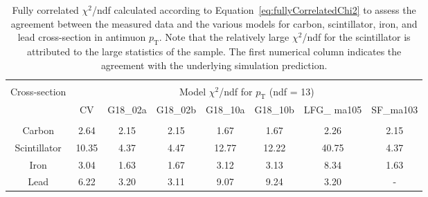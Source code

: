 \begin{table}[t!]
    \centering
    \begin{adjustbox}{width=1.01\textwidth,center=\textwidth}
    \begin{tabular}{c c c c c c c c}
    \hline \\ [-1.5 ex]
    \multirow[c]{2}{*}{Cross-section} & \multicolumn{7}{c}{Model $\chi^2$/ndf for $p_{\text{T}}$ (ndf = 13) } \\ [0.8ex]
    & CV & G18\_02a & G18\_02b & G18\_10a & G18\_10b & LFG\_ ma105 & SF\_ma103\\ [0.5ex] %
    \hline
    \hline \\[-1.9ex]
    Carbon & 2.64 & 2.15 & 2.15 & 1.67 & 1.67 & 2.26 & 2.15 \\
    Scintillator & 10.35 & 4.37 & 4.47 & 12.77 & 12.22 & 40.75 & 4.37\\
    Iron & 3.04 & 1.63 & 1.67 & 3.12 & 3.13 & 8.34 &1.63 \\
    Lead & 6.22 & 3.20 & 3.11 & 9.07 & 9.24 & 3.20 & - \\

    \hline
    \end{tabular}
    \end{adjustbox}

    \caption{Fully correlated $\chi^2$/ndf calculated according to Equation~\ref{eq:fullyCorrelatedChi2} to assess the agreement between the measured data and the various models for carbon, scintillator, iron, and lead cross-section in antimuon $p_{\text{T}}$. Note that the relatively large $\chi^2$/ndf for the scintillator is attributed to the large statistics of the sample. The first numerical column indicates the agreement with the underlying simulation prediction.}
    \label{table:xsec_modelComparison_pT}
\end{table}


